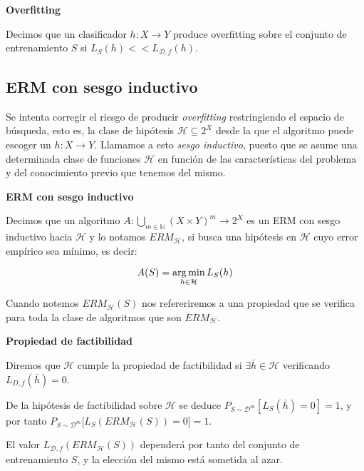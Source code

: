 \begin{definition*} \textbf{Overfitting}

 Decimos que un clasificador $h: X\rightarrow Y$ produce overfitting sobre el conjunto de entrenamiento 
 $S$ si $L_S(h) << L_{\mathcal{D},f}(h)$.
\end{definition*}


\subsection{ERM con sesgo inductivo}
Se intenta corregir el riesgo de producir \emph{overfitting} restringiendo el espacio de búsqueda, esto es, la clase de 
hipótesis $\mathcal{H} \subseteq 2^X$ desde la que el algoritmo puede escoger un $h: X\rightarrow Y$. Llamamos a esto 
\emph{sesgo inductivo}, puesto que se asume una determinada clase de funciones $\mathcal{H}$ en función de las 
características del problema y del conocimiento previo que tenemos del mismo.

\begin{definition*} \textbf{ERM con sesgo inductivo}

Decimos que un algoritmo $A: \underset{m\in \mathbb{N}}{\bigcup} (X\times Y)^m \rightarrow 2^{X}$ es un ERM con sesgo 
inductivo hacia $\mathcal{H}$ y lo notamos $ERM_{\mathcal{H}}$, si busca una hipótesis en $\mathcal{H}$ cuyo error empírico 
sea mínimo, es decir:

\[A(S) = \operatorname*{arg\,min}_{h\in \mathcal{H}} L_S(h)\]
\end{definition*}

Cuando notemos $ERM_{\mathcal{H}}(S)$ nos refereriremos a una propiedad que se verifica para toda la clase de algoritmos que 
son $ERM_{\mathcal{H}}$.

\begin{definition*} \textbf{Propiedad de factibilidad}

Diremos que $\mathcal{H}$ cumple la propiedad de factibilidad si $\exists {\bar{h}} \in \mathcal{H}$ verificando $L_{D,f}(\bar{h}) = 0$.
\end{definition*}

De la hipótesis de factibilidad sobre $\mathcal{H}$ se deduce $P_{S\sim \mathcal{D}^m}[L_S(\bar{h})=0] = 1$, y por tanto 
$P_{S\sim \mathcal{D}^m} \bigg[L_S(ERM_{\mathcal{H}}(S)) = 0 \bigg] = 1$.

El valor $L_{\mathcal{D},f}(ERM_{\mathcal{H}}(S))$ dependerá por tanto del conjunto de entrenamiento $S$, y la elección del
mismo está sometida al azar. 

